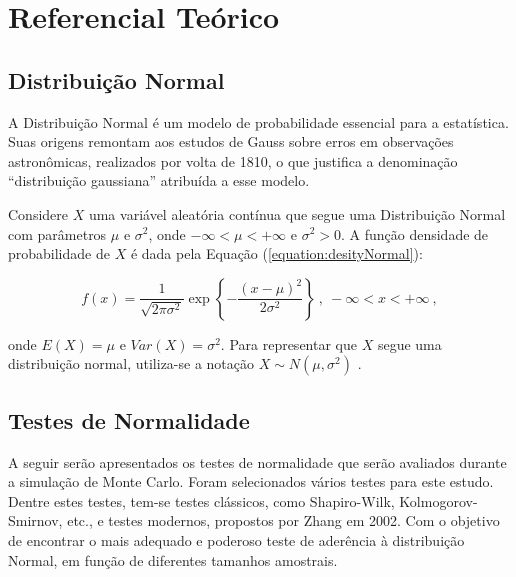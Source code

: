 \documentclass[a4paper,11pt]{article} %
\begin{document}
\section{Referencial Teórico} %

\subsection{Distribuição Normal} %

A Distribuição Normal é um modelo de probabilidade essencial para a estatística. Suas origens remontam aos estudos de Gauss sobre erros em observações astronômicas, realizados por volta de 1810, o que justifica a denominação “distribuição gaussiana” atribuída a esse modelo.

\vspace{0.5cm}

Considere $X$ uma variável aleatória contínua que segue uma Distribuição Normal com parâmetros $\mu$ e $\sigma^{2}$, onde $-\infty < \mu < +\infty$ e $\sigma^{2} > 0$. A função densidade de probabilidade de $X$ é dada pela Equação (\ref{equation:desityNormal}):

\begin{equation}
    f(x) = \dfrac{1}{\sqrt{2 \pi \sigma^2}} \exp\left\{ {{- \dfrac{(x - \mu)^{2}}{2 \sigma^2}}} \right\} \ , \ - \infty < x < +\infty \ ,
    \label{equation:desityNormal}
\end{equation}

\noindent onde $E(X) = \mu$ e $Var(X) = \sigma^2$. Para representar que $X$ segue uma distribuição normal, utiliza-se a notação $X \sim N(\mu, \sigma^2)$ \cite{bussab2010estatistica}.

\subsection{Testes de Normalidade} \label{section:tests_norm} %

A seguir serão apresentados os testes de normalidade que serão avaliados durante a simulação de Monte Carlo. Foram selecionados vários testes para este estudo. Dentre estes testes, tem-se testes clássicos, como Shapiro-Wilk, Kolmogorov-Smirnov, etc., e testes modernos, propostos por Zhang em 2002. Com o objetivo de encontrar o mais adequado e poderoso teste de aderência à distribuição Normal, em função de diferentes tamanhos amostrais.
\end{document}
